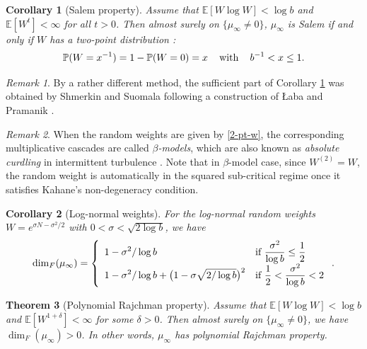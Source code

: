 \documentclass[12pt]{amsart}
\newtheorem{theorem}{Theorem}[section]
\newtheorem{corollary}[theorem]{Corollary}
\theoremstyle{definition}
\theoremstyle{remark}
\newtheorem*{remark*}{Remark}
\newcommand{\E}{\mathbb{E}}
\newcommand{\PP}{\mathbb{P}}
\numberwithin{equation}{section}
\begin{document}
\begin{corollary}[Salem property]\label{cor-salem}
Assume that $\E[W\log W]<\log b$ and $\E[W^t]<\infty$ for all $t>0$.  Then almost surely on $\{\mu_\infty\ne 0\}$,   $\mu_\infty$ is Salem if and only if $W$ has a two-point distribution : 
\begin{align}\label{2-pt-w}
\PP(W= x^{-1})= 1 - \PP(W=0) = x \quad \text{\,with\,} \quad  b^{-1}<x\le 1.
\end{align}
\end{corollary}

\begin{remark*}
By a rather different method,  the sufficient part of Corollary \ref{cor-salem} was  obtained by Shmerkin and Suomala \cite{SS18} following a construction of  {\L}aba and Pramanik \cite{LP09}. 
\end{remark*}

\begin{remark*}
When the random weights are given by \eqref{2-pt-w}, the corresponding multiplicative cascades  are called   {\it $\beta$-models}, which are also known as {\it absolute curdling} in intermittent turbulence \cite{M76}.   Note that in $\beta$-model case, since $W^{(2)} = W$, the random weight is automatically in the squared sub-critical regime once it satisfies Kahane's non-degeneracy condition. 
\end{remark*}


 
 \begin{corollary}[Log-normal weights]\label{cor-log-normal}
For the   log-normal random weights $W=e^{\sigma N-\sigma^2/2}$ with $0< \sigma < \sqrt{2 \log b}$,  we have 
 \[
 \dim_F(\mu_\infty)  =  \left\{
 \begin{array}{ll}
  \displaystyle 1-  \sigma^2/\log b  & \text{if $ \displaystyle \frac{\sigma^2}{\log b} \le  \frac{1}{2}$}
  \\  
    \displaystyle     1-  \sigma^2/\log b  +     \big( 1 -  \sigma \sqrt{2/\log b} \big)^2 & \text{if $ \displaystyle \frac{1}{2} <   \frac{\sigma^2}{\log b} <  2$}
 \end{array}
 \right.. 
 \]
 \end{corollary}
 
 
 
 
 
 




	
	
	

\begin{theorem}[Polynomial Rajchman property]\label{thm-pRaj}
	Assume that $\E[W\log W]<\log b$ and $\E[W^{1+\delta}]<\infty$ for some $\delta>0$. Then almost surely on $\{\mu_\infty\ne 0\}$, we have $\dim_F(\mu_\infty)>0$. In other words,  $\mu_\infty$ has  polynomial Rajchman property. 
\end{theorem} 
\end{document}
